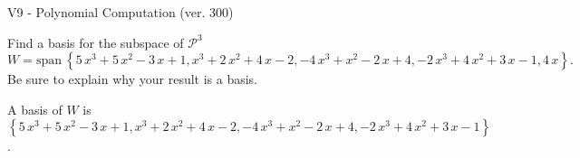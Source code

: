 \begin{exercise}
  \begin{exerciseTitle}V9 - Polynomial Computation (ver. 300)\end{exerciseTitle}
  \begin{exerciseStatement}
    Find a basis for the subspace of \(\mathcal{P}^3\) 
\[W=\mathrm{span}\ \left\{5 \, x^{3} + 5 \, x^{2} - 3 \, x + 1 , x^{3} + 2 \, x^{2} + 4 \, x - 2 , -4 \, x^{3} + x^{2} - 2 \, x + 4 , -2 \, x^{3} + 4 \, x^{2} + 3 \, x - 1 , 4 \, x\right\}.\]
 Be sure to explain why your result is a basis.


  \end{exerciseStatement}
  \begin{exerciseAnswer}
   A basis of \(W\) is  \(\left\{5 \, x^{3} + 5 \, x^{2} - 3 \, x + 1 , x^{3} + 2 \, x^{2} + 4 \, x - 2 , -4 \, x^{3} + x^{2} - 2 \, x + 4 , -2 \, x^{3} + 4 \, x^{2} + 3 \, x - 1\right\}\).
  


  \end{exerciseAnswer}
\end{exercise}